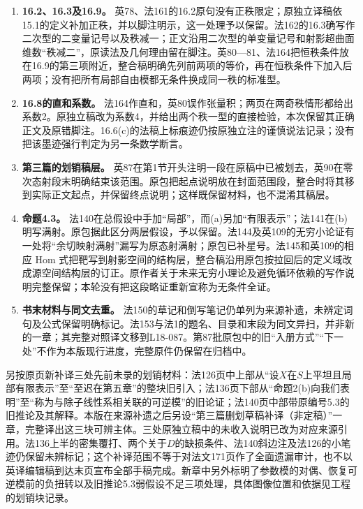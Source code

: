 \documentclass[UTF8,a4paper]{ctexbook}
\begin{document}
\begin{enumerate}[label=\arabic*.]
\item \textbf{16.2、16.3及16.9。} 英78、法161的16.2原句没有正秩限定；原独立译稿依15.1的定义补加正秩，并以脚注明示，这一处理予以保留。法162的16.3确写作二次型的二变量记号以及秩减一；正文沿用二次型的单变量记号和射影超曲面维数“秩减二”，原读法及几何理由留在脚注。英80—81、法164把恒秩条件放在16.9的第三项附近，整合稿明确先列前两项的等价，再在恒秩条件下加入后两项；没有把所有局部自由模都无条件换成同一秩的标准型。
\item \textbf{16.8的直和系数。} 法164作直和，英80误作张量积；两页在两奇秩情形都给出系数2。原独立稿改为系数4，并给出两个秩一型的直接检验，本次保留其正确正文及原错脚注。16.6(c)的法稿上标痕迹仍按原独立注的谨慎说法记录；没有把该墨迹强行判定为另一条数学断言。
\item \textbf{第三篇的划销稿层。} 英87在第1节开头注明一段在原稿中已被划去，英90在零次态射段末明确结束该范围。原包把起点说明放在封面范围段，整合时将其移到实际正文起点，并保留终点说明；这样既保留材料，也不混淆其稿层。
\item \textbf{命题4.3。} 法140在总假设中手加“局部”，而(a)另加“有限表示”；法141在(b)明写满射。原包据此区分两层假设，予以保留。法144及英109的无穷小论证有一处将“余切映射满射”漏写为原态射满射；原包已补星号。法145和英109的相应 Hom 式把靶写到射影空间的结构层，整合稿沿用原包按拉回后的定义域改成源空间结构层的订正。原作者关于未来无穷小理论及避免循环依赖的写作说明完整保留；本轮没有把这段略证重新宣称为无条件全证。
\item \textbf{书末材料与同文去重。} 法150的草记和倒写笔记仍单列为来源补遗，未辨定词句及公式保留明确标记。法153与法1的题名、目录和末段为同文异扫，并非新的一章；其完整对照译文移到L18-087。第87批原包中的旧“入册方式”“下一处”不作为本版现行进度，完整原件仍保留在归档中。
\end{enumerate}

另按原页新补译三处先前未录的划销材料：法126页中上部从“设$X$在$S$上平坦且局部有限表示”至“至迟在第五章”的整块旧引入；法136页下部从“命题2(b)向我们表明”至“称为与除子线性系相关联的可逆模”的旧论证；法140页中部带原编号5.3的旧推论及其解释。本版在来源补遗之后另设“第三篇删划草稿补译（非定稿）”一章，完整译出这三块可辨主体。三处原独立稿中的未收入说明已改为对应来源引用。法136上半的密集覆打、两个关于$D$的缺损条件、法140斜边注及法126的小笔迹仍保留未辨标记；这个补译范围不等于对法文171页作了全面遗漏审计，也不以英译编辑稿到达末页宣布全部手稿完成。新章中另外标明了参数模的对偶、恢复可逆模前的负扭转以及旧推论5.3弱假设不足三项处理，具体图像位置和依据见工程的划销块记录。
\end{document}
